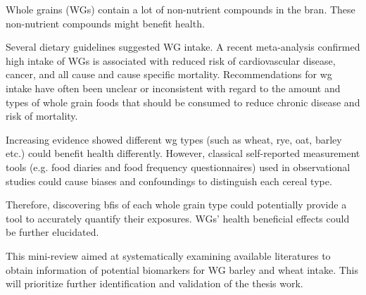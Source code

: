 Whole grains (WGs) contain a lot of non-nutrient compounds in the bran. 
These non-nutrient compounds might benefit health.

Several dietary guidelines suggested WG intake\cite{Piepoli2016}. A recent meta-analysis confirmed high intake of WGs is associated with reduced risk of cardiovascular disease, cancer, and all cause and cause specific mortality\cite{Aune2016}. Recommendations for \acrshort{wg} intake have often been unclear or inconsistent with regard to the amount and types of whole grain foods that should be consumed to reduce chronic disease and risk of mortality.

Increasing evidence showed different \acrshort{wg} types (such as wheat, rye, oat, barley etc.) could benefit health differently. 
However, classical self-reported measurement tools (e.g. food diaries and food frequency questionnaires) used in observational studies could cause biases and confoundings to distinguish each cereal type.
 


Therefore, discovering \acrshort{bfis} of each whole grain type could potentially provide a tool to accurately quantify their exposures. WGs' health beneficial effects could be further elucidated. 

This mini-review aimed at systematically examining available literatures to obtain information of potential biomarkers for WG barley and wheat intake. This will prioritize further identification and validation of the thesis work.